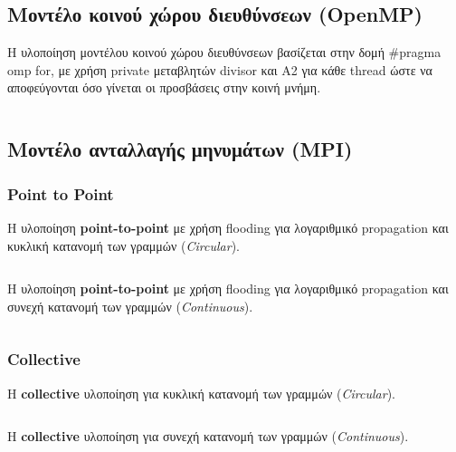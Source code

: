 \documentclass[a4paper,10pt]{article} \usepackage{anysize}
\begin{document}

\subsection{Μοντέλο κοινού χώρου διευθύνσεων (\textbf{OpenMP})}

Η υλοποίηση μοντέλου κοινού χώρου διευθύνσεων βασίζεται στην δομή #pragma omp for, με χρήση private μεταβλητών divisor και A2 για κάθε thread ώστε να αποφεύγονται όσο γίνεται οι προσβάσεις στην κοινή μνήμη.

\inputminted[linenos,fontsize=\scriptsize,frame=leftline]{c}{files/src-openmp-main.c}

\pagebreak

\subsection{Μοντέλο ανταλλαγής μηνυμάτων (\textbf{MPI})}

\subsubsection{Point to Point}

Η υλοποίηση \textbf{point-to-point} με χρήση flooding για λογαριθμικό
propagation και κυκλική κατανομή των γραμμών (\textit{Circular}).

\inputminted[linenos,fontsize=\scriptsize,frame=leftline]{c}{files/src-mpi-ptp-hybrid-main.c}

Η υλοποίηση \textbf{point-to-point} με χρήση flooding για λογαριθμικό
propagation και συνεχή κατανομή των γραμμών (\textit{Continuous}).

\inputminted[linenos,fontsize=\scriptsize,frame=leftline]{c}{files/src-mpi-ptp-continuous-single-main.c}

\subsubsection{Collective}
Η \textbf{collective} υλοποίηση για κυκλική κατανομή των γραμμών
(\textit{Circular}).

\inputminted[linenos,fontsize=\scriptsize,frame=leftline]{c}{files/src-mpi-collective-hybrid-main.c}

Η \textbf{collective} υλοποίηση για συνεχή κατανομή των γραμμών
(\textit{Continuous}).

\inputminted[linenos,fontsize=\scriptsize,frame=leftline]{c}{files/src-mpi-collective-continuous-single-main.c}

\end{document}
